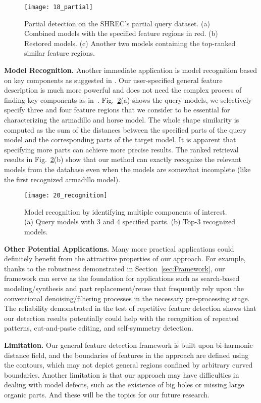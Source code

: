 \begin{figure}[!tbh]
\centering
\texttt{[image: 18\_partial]}
\caption{Partial detection on the SHREC's partial query dataset. (a) Combined models with the specified feature regions in red. (b) Restored models.
(c) Another two models containing the top-ranked similar feature regions.}
\label{partial-query}
\end{figure}

\textbf{Model Recognition.} Another immediate application is model
recognition based on key components as suggested
in \cite{Sipiran:2012}. Our user-specified general feature description
is much more powerful and does not need the complex process of finding
key components as in~\cite{Sipiran:2012}.
Fig.~\ref{recognition}(a) shows the query models, we selectively
specify three and four feature regions that we consider to be essential
for characterizing the armadillo and horse model. The
whole shape similarity is computed as the sum of the distances between the
specified parts of the query model and the corresponding parts of the
target model. It is apparent that specifying more parts can achieve more
precise results. The ranked retrieval results in Fig.~\ref{recognition}(b)
show that our method can exactly recognize the relevant models from the
database even when the models are somewhat incomplete (like the first
recognized armadillo model).

\begin{figure}[!tbh]
\centering
\texttt{[image: 20\_recognition]}
\caption{Model recognition by identifying multiple components of
  interest. (a) Query models with 3 and 4 specified parts.
  (b) Top-3 recognized models.}
\label{recognition}
\end{figure}

\textbf{Other Potential Applications.} Many more practical
applications could definitely benefit from the attractive properties
of our approach. For example, thanks to the robustness demonstrated
in Section~\ref{sec:Framework}, our framework can serve as the
foundation for applications such as search-based modeling/synthesis and
part replacement/reuse that frequently rely upon the
conventional denoising/filtering processes in the necessary
pre-processing stage. The reliability demonstrated in the test of
repetitive feature detection shows that our detection results
potentially could help with the recognition of repeated patterns,
cut-and-paste editing, and self-symmetry detection.

\textbf{Limitation.}
Our general feature detection framework is built upon bi-harmonic distance field,
and the boundaries of features in the approach are defined using the
contours, which may not depict general regions confined by arbitrary
curved boundaries. Another limitation is that our approach may have
difficulties in dealing with model defects, such as the existence of
big holes or missing large organic parts. And these will be the
topics for our future research.


